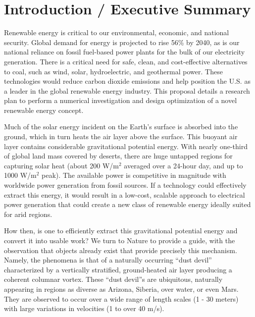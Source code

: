 \section{Introduction / Executive Summary}

Renewable energy is critical to our environmental, economic, and
national security. Global demand for energy is projected to rise 56\% by
2040\cite{energy-outlook}, as is our national reliance on fossil
fuel-based power plants for the bulk of our electricity generation. 
There is a critical need for safe, clean, and
cost-effective alternatives to coal, such as wind, solar, hydroelectric,
and geothermal power. These technologies would reduce carbon dioxide
emissions and help position the U.S. as a leader in the global renewable
energy industry. 
%
This proposal details a research plan to perform a numerical
investigation and design optimization of a novel renewable energy concept. 

Much of the solar energy incident on the Earth's surface is absorbed
into the ground, which in turn heats the air layer above the surface.
This buoyant air layer contains considerable gravitational potential
energy. 
With nearly one-third of global land mass covered by deserts, there are huge
untapped regions for capturing solar heat (about 200 W/$\text{m}^2$
averaged over a 24-hour day, and up to 1000 W/$\text{m}^2$
peak)\cite{Hoyt197827}. The available power is competitive in magnitude
with worldwide power generation from fossil sources. If a technology
could effectively extract this energy, it would result in a low-cost,
scalable approach to electrical power generation that could create a new
class of renewable energy ideally suited for arid regions.  

How then, is one to efficiently extract this gravitational potential
energy and convert it into usable work? We turn to Nature to provide a 
guide, with the observation that objects already
exist that provide precisely this mechanism. Namely, the phenomena is
that of a naturally occurring ``dust devil'' 
%
%
characterized by a vertically stratified, ground-heated air layer
producing a coherent columnar vortex. These ``dust devil''s are
ubiquitous, naturally appearing in regions as diverse as Arizona,
Siberia, over water, or even
Mars\cite{Sinclair1969,ROG:ROG1635,JGRE:JGRE1660}.  
They are observed to occur over a wide range of length scales (1 - 30
meters) with large variations in velocities (1 to over 40
m/s)\cite{Sinclair1969}. 

